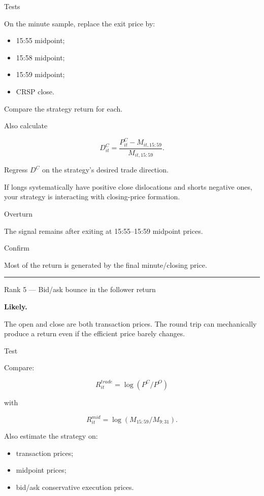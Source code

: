 Tests

On the minute sample, replace the exit price by:

\begin{itemize}
\tightlist
\item
  15:55 midpoint;
\item
  15:58 midpoint;
\item
  15:59 midpoint;
\item
  CRSP close.
\end{itemize}

Compare the strategy return for each.

Also calculate

\[
D^C_{it}
=
\frac{P^C_{it}-M_{it,15:59}}
{M_{it,15:59}}.
\]

Regress \(D^C\) on the strategy's desired trade direction.

If longs systematically have positive close dislocations and shorts negative ones, your strategy is interacting with closing-price formation.

Overturn

The signal remains after exiting at 15:55--15:59 midpoint prices.

Confirm

Most of the return is generated by the final minute/closing price.

\begin{center}\rule{0.5\linewidth}{0.5pt}\end{center}

Rank 5 --- Bid/ask bounce in the follower return

\textbf{Likely.}

The open and close are both transaction prices. The round trip can mechanically produce a return even if the efficient price barely changes.

Test

Compare:

\[
R^{trade}_{it}
=
\log(P^C/P^O)
\]

with

\[
R^{mid}_{it}
=
\log(M_{15:59}/M_{9:31}).
\]

Also estimate the strategy on:

\begin{itemize}
\tightlist
\item
  transaction prices;
\item
  midpoint prices;
\item
  bid/ask conservative execution prices.
\end{itemize}

